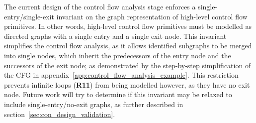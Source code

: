 
The current design of the control flow analysis stage enforces a single-entry/single-exit invariant on the graph representation of high-level control flow primitives. In other words, high-level control flow primitives must be modelled as directed graphs with a single entry and a single exit node. This invariant simplifies the control flow analysis, as it allows identified subgraphs to be merged into single nodes, which inherit the predecessors of the entry node and the successors of the exit node; as demonstrated by the step-by-step simplification of the CFG in appendix~\ref{app:control_flow_analysis_example}. This restriction prevents infinite loops (\textbf{R11}) from being modelled however, as they have no exit node. Future work will try to determine if this invariant may be relaxed to include single-entry/no-exit graphs, as further described in section~\ref{sec:con_design_validation}.
